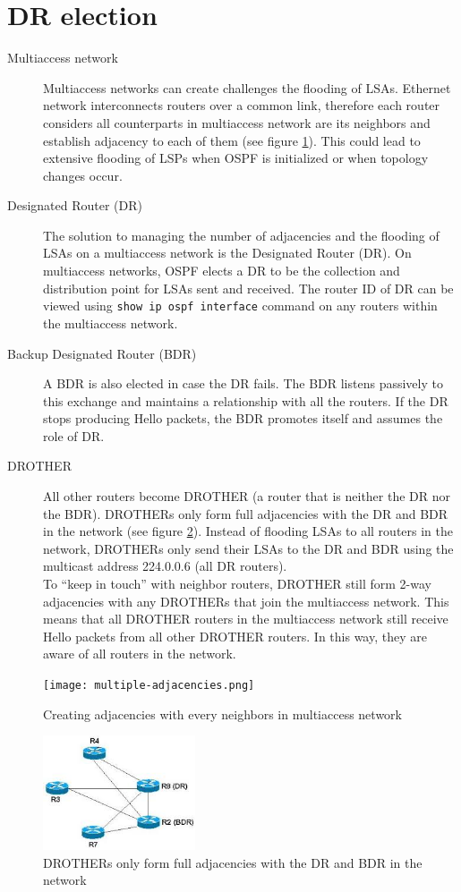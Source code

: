 \section{DR election}
\begin{description}
	\item[Multiaccess network] Multiaccess networks can create challenges the flooding of LSAs. Ethernet network interconnects routers over a common link, therefore each router considers all counterparts in multiaccess network are its neighbors and establish adjacency to each of them (see figure \ref{multiple-adjacencies}). This could lead to extensive flooding of LSPs when OSPF is initialized or when topology changes occur.
	\item[Designated Router (DR)] The solution to managing the number of adjacencies and the flooding of LSAs on a multiaccess network is the Designated Router (DR). On multiaccess networks, OSPF elects a DR to be the collection and distribution point for LSAs sent and received. The router ID of DR can be viewed using \texttt{show ip ospf interface} command on any routers within the multiaccess network.
	\item[Backup Designated Router (BDR)] A BDR is also elected in case the DR fails. The BDR listens passively to this exchange and maintains a relationship with all the routers. If the DR stops producing Hello packets, the BDR promotes itself and assumes the role of DR.
	\item[DROTHER] All other routers become DROTHER (a router that is neither the DR nor the BDR). DROTHERs only form full adjacencies with the DR and BDR in the network (see figure \ref{DR-adjacency}). Instead of flooding LSAs to all routers in the network, DROTHERs only send their LSAs to the DR and BDR using the multicast address 224.0.0.6 (all DR routers). \\
	To ``keep in touch'' with neighbor routers, DROTHER still form 2-way adjacencies with any DROTHERs that join the multiaccess network. This means that all DROTHER routers in the multiaccess network still receive Hello packets from all other DROTHER routers. In this way, they are aware of all routers in the network.
	\end{description}
\begin{figure}[hbtp]
	\centering
	\texttt{[image: multiple-adjacencies.png]} 
	\caption{Creating adjacencies with every neighbors in multiaccess network}
	\label{multiple-adjacencies}
	\end{figure}
\begin{figure}[hbtp]
	\centering
	\includegraphics[width=0.4\textwidth]{pictures/dr-bdr.jpeg}
	\caption{DROTHERs only form full adjacencies with the DR and BDR in the network}
	\label{DR-adjacency}
	\end{figure}
